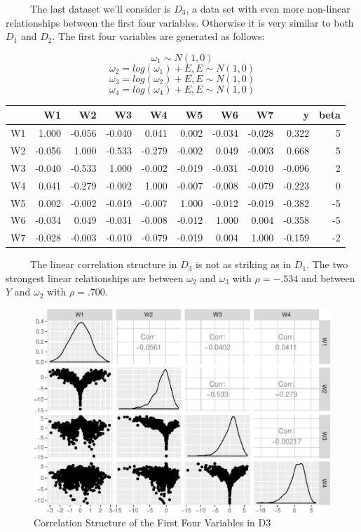 \documentclass[12pt,twoside]{reedthesis}
\begin{document}
  ~~~~~The last dataset we'll consider is \(D_3\), a data set with even
  more non-linear relationships between the first four variables.
  Otherwise it is very similar to both \(D_1\) and \(D_2\). The first four
  variables are generated as follows:
  
  \[\omega_1 \sim N(1,0)\] \[\omega_2 = log(\omega_1) + E, E \sim N(1,0)\]
  \[\omega_3 = log(\omega_2) + E, E \sim N(1,0)\]
  \[\omega_4 = log(\omega_4) + E, E \sim N(1,0)\]
  
  \begin{tabular}{l|r|r|r|r|r|r|r|r|r}
  \hline
    & W1 & W2 & W3 & W4 & W5 & W6 & W7 & y & beta\\
  \hline
  W1 & 1.000 & -0.056 & -0.040 & 0.041 & 0.002 & -0.034 & -0.028 & 0.322 & 5\\
  \hline
  W2 & -0.056 & 1.000 & -0.533 & -0.279 & -0.002 & 0.049 & -0.003 & 0.668 & 5\\
  \hline
  W3 & -0.040 & -0.533 & 1.000 & -0.002 & -0.019 & -0.031 & -0.010 & -0.096 & 2\\
  \hline
  W4 & 0.041 & -0.279 & -0.002 & 1.000 & -0.007 & -0.008 & -0.079 & -0.223 & 0\\
  \hline
  W5 & 0.002 & -0.002 & -0.019 & -0.007 & 1.000 & -0.012 & -0.019 & -0.382 & -5\\
  \hline
  W6 & -0.034 & 0.049 & -0.031 & -0.008 & -0.012 & 1.000 & 0.004 & -0.358 & -5\\
  \hline
  W7 & -0.028 & -0.003 & -0.010 & -0.079 & -0.019 & 0.004 & 1.000 & -0.159 & -2\\
  \hline
  \end{tabular}
  
  ~~~~~The linear correlation structure in \(D_3\) is not as striking as
  in \(D_1\). The two strongest linear relationships are between
  \(\omega_2\) and \(\omega_3\) with \(\rho = -.534\) and between \(Y\)
  and \(\omega_2\) with \(\rho = .700\).
  
  \begin{figure}[htbp]
  \centering
  \includegraphics{Thesis_files/figure-latex/corstructD3-1.pdf}
  \caption{\label{fig:corstructD3}Correlation Structure of the First Four
  Variables in D3}
  \end{figure}
  
\end{document}
